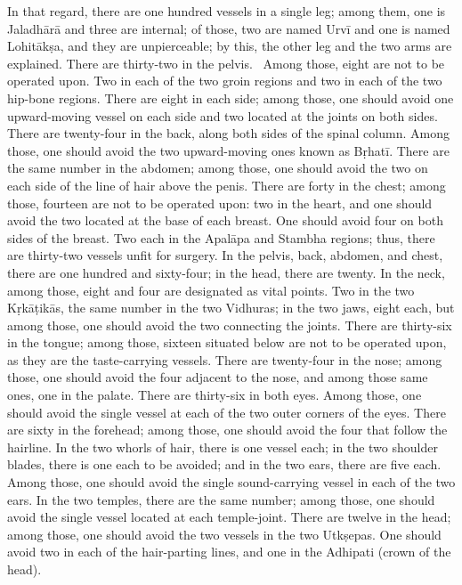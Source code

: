 \begin{translation}
\begin{tt}
\item[22]
In that regard, there are one hundred vessels in a single leg; among them, one is Jaladhārā and three are internal; of those, two are named Urvī and one is named Lohitākṣa, and they are unpierceable; by this, the other leg and the two arms are explained.
There are thirty-two in the pelvis. 
Among those, eight are not to be operated upon.
Two in each of the two groin regions and two in each of the two hip-bone regions.
There are eight in each side; among those, one should avoid one upward-moving vessel on each side and two located at the joints on both sides.
There are twenty-four in the back, along both sides of the spinal column.
Among those, one should avoid the two upward-moving ones known as Bṛhatī.
There are the same number in the abdomen; among those, one should avoid the two on each side of the line of hair above the penis.
There are forty in the chest; among those, fourteen are not to be operated upon: two in the heart, and one should avoid the two located at the base of each breast.
One should avoid four on both sides of the breast.
Two each in the Apalāpa and Stambha regions; thus, there are thirty-two vessels unfit for surgery.
In the pelvis, back, abdomen, and chest, there are one hundred and sixty-four; in the head, there are twenty.
In the neck, among those, eight and four are designated as vital points.
Two in the two Kṛkāṭikās, the same number in the two Vidhuras; in the two jaws, eight each, but among those, one should avoid the two connecting the joints.
There are thirty-six in the tongue; among those, sixteen situated below are not to be operated upon, as they are the taste-carrying vessels.
There are twenty-four in the nose; among those, one should avoid the four adjacent to the nose, and among those same ones, one in the palate.
There are thirty-six in both eyes.
Among those, one should avoid the single vessel at each of the two outer corners of the eyes.
There are sixty in the forehead; among those, one should avoid the four that follow the hairline.
In the two whorls of hair, there is one vessel each; in the two shoulder blades, there is one each to be avoided; and in the two ears, there are five each.
Among those, one should avoid the single sound-carrying vessel in each of the two ears.
In the two temples, there are the same number; among those, one should avoid the single vessel located at each temple-joint.
There are twelve in the head; among those, one should avoid the two vessels in the two Utkṣepas.
One should avoid two in each of the hair-parting lines, and one in the Adhipati (crown of the head).


\end{tt}
\end{translation}
